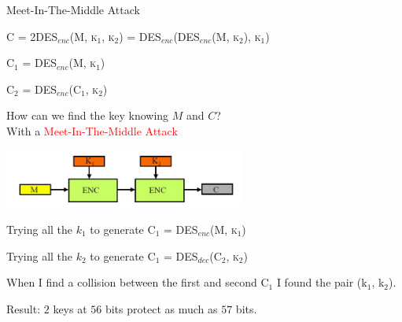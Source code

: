 \documentclass[handout, xcolor=dvipsnames,aspectratio=169]{beamer}
\begin{document}
\begin{frame}{Meet-In-The-Middle Attack}

  \small

  \textsc{C = 2DES$_{enc}$(M, k$_1$, k$_2$) = DES$_{enc}$(DES$_{enc}$(M, k$_2$), k$_1$)}

  \medskip

  \textsc{C$_1$ = DES$_{enc}$(M, k$_1$)}

  \smallskip

  \textsc{C$_2$ = DES$_{enc}$(C$_1$, k$_2$)}

  \medskip

  How can we find the key knowing $M$ and $C$? \\
  With a \textcolor{red}{Meet-In-The-Middle Attack}

  \begin{center}
    \includegraphics[width=8cm]{img/middle}
  \end{center}


  Trying all the $k_1$ to generate \textsc{C$_1$ = DES$_{enc}$(M, k$_1$)}

  \smallskip

  Trying all the $k_2$ to generate \textsc{C$_1$ = DES$_{dec}$(C$_2$, k$_2$)}

  \smallskip

  When I find a collision between the first and second C$_1$ I found the pair (k$_1$, k$_2$).

  \smallskip

  Result: $2$ keys at $56$ bits protect as much as $57$ bits.

\end{frame}
\end{document}
